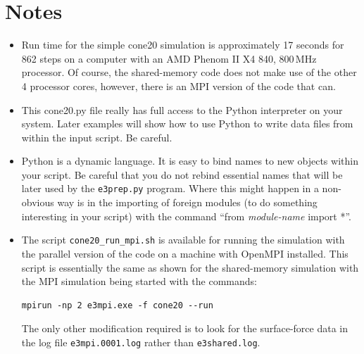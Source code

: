 \section{Notes}
\begin{itemize}
\item Run time for the simple cone20 simulation 
      is approximately 17 seconds for 862 steps on a computer with 
      an AMD Phenom II X4 840, 800\,MHz processor.
      Of course, the shared-memory code does not make use of the other 4 processor cores,
      however, there is an MPI version of the code that can.

\item This cone20.py file really has full access to the Python interpreter
      on your system.  Later examples will show how to use Python to write
      data files from within the input script.  Be careful.

\item Python is a dynamic language.
      It is easy to bind names to new objects within your script.
      Be careful that you do not rebind essential names that will be
      later used by the \texttt{e3prep.py} program.
      Where this might happen in a non-obvious way is in the importing
      of foreign modules (to do something interesting in your script)
      with the command ``from \textit{module-name} import *''.

\item The script \texttt{cone20\_run\_mpi.sh} is available for running the simulation
  with the parallel version of the code on a machine with OpenMPI installed.
  This script is essentially the same as shown for the shared-memory simulation
  with the MPI simulation being started with the commands:
\begin{verbatim}
mpirun -np 2 e3mpi.exe -f cone20 --run
\end{verbatim}
  The only other modification required is to look for the surface-force data in the
  log file \texttt{e3mpi.0001.log} rather than \texttt{e3shared.log}.

\end{itemize}
